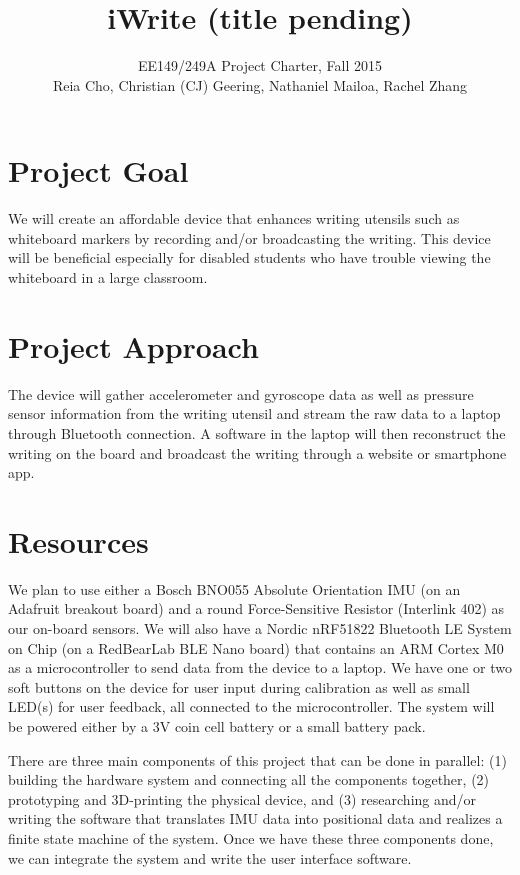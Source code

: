 \documentclass[12pt,journal]{IEEEtran}
\begin{document}
\title{iWrite (title pending)}

\author{EE149/249A Project Charter, Fall 2015

Reia Cho, Christian (CJ) Geering, Nathaniel Mailoa, Rachel Zhang}


\maketitle

\section{Project Goal}
We will create an affordable device that enhances writing utensils such as whiteboard markers by recording and/or broadcasting the writing. This device will be beneficial especially for disabled students who have trouble viewing the whiteboard in a large classroom.


\section{Project Approach}
The device will gather accelerometer and gyroscope data as well as pressure sensor information from the writing utensil and stream the raw data to a laptop through Bluetooth connection. A software in the laptop will then reconstruct the writing on the board and broadcast the writing through a website or smartphone app.


\section{Resources}
We plan to use either a Bosch BNO055 Absolute Orientation IMU (on an Adafruit breakout board) and a round Force-Sensitive Resistor (Interlink 402) as our on-board sensors. We will also have a Nordic nRF51822 Bluetooth LE System on Chip (on a RedBearLab BLE Nano board) that contains an ARM Cortex M0 as a microcontroller to send data from the device to a laptop. We have one or two soft buttons on the device for user input during calibration as well as small LED(s) for user feedback, all connected to the microcontroller. The system will be powered either by a 3V coin cell battery or a small battery pack.

There are three main components of this project that can be done in parallel: (1) building the hardware system and connecting all the components together, (2) prototyping and 3D-printing the physical device, and (3) researching and/or writing the software that translates IMU data into positional data and realizes a finite state machine of the system. Once we have these three components done, we can integrate the system and write the user interface software.
\end{document}
